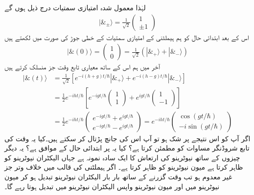 لہٰذا معمول شدہ امتیازی سمتیات درج ذیل ہوں گے 
\begin{align*}
| \& _{\pm} \rangle = \frac{1}{\sqrt{2}} \begin{pmatrix} 1 \\ \pm 1 \end{pmatrix}
\end{align*}
اس کے بعد ابتدائی حال کو ہم ہیملٹنی کے امتیازی سمتیات کے خطی جوڑ کی صورت میں لکھتے ہیں 
\begin{align*}
| \& (0) \rangle = \begin{pmatrix} 1 \\ 0  \end{pmatrix} = \frac{1}{\sqrt{2}} ( | \&_{+} \rangle + | \&_{-} \rangle )
\end{align*}
آخر میں ہم اس کے ساتھ معیاری تابع وقت جز  منسلک کرتے ہیں 
\begin{align*}
| \& (t) \rangle &= \frac{1}{\sqrt{2}} [ e^{-i(h+g)t/\hbar} | \&_{+} \rangle + e^{-i(h-g)t/\hbar} | \&_{-} \rangle ] \\
&= \frac{1}{2} e^{-iht/\hbar} \left[ e^{-igt/\hbar} \begin{pmatrix} 1 \\ 1 \end{pmatrix} + e^{igt/\hbar} \begin{pmatrix} 1 \\ -1  \end{pmatrix} \right] \\
&= \frac{1}{2} e^{-iht/\hbar} \begin{pmatrix} e^{-igt/\hbar} + e^{igt/\hbar} \\ e^{-igt/\hbar} - e^{igt/\hbar} \end{pmatrix} = e^{-iht/\hbar} \begin{pmatrix} \cos (gt/\hbar) \\ -i\sin (gt/\hbar) \end{pmatrix}
\end{align*}
اگر آپ کو اس نتیجے پر شک ہو تو آپ اس کی جانچ پڑتال کر سکتے ہیں۔کیا یہ وقت کی تابع شروڈنگر مساوات کو مطمئن کرتا ہے؟ کیا یہ  پر ابتدائی حال کے موافق ہے؟ 
یہ دیگر چیزوں کے ساتھ نیوٹرینو کی ارتعاش کا ایک سادہ نمونہ ہے جہاں  الیکٹران نیوٹرینو کو ظاہر کرتا ہے  میون نیوٹرینو کو ظاہر کرتا ہے۔ اگر ہیملٹنی کی قالب میں خلاف وتر جز  غیر معدوم ہو تب وقت گزرنے کے ساتھ بار بار الیکٹران نیوٹرینو تبدیل ہو کر میون نیوٹرینو میں اور میون نیوٹرینو واپس الیکٹران نیوٹرینو میں تبدیل ہوتا رہے گا۔
